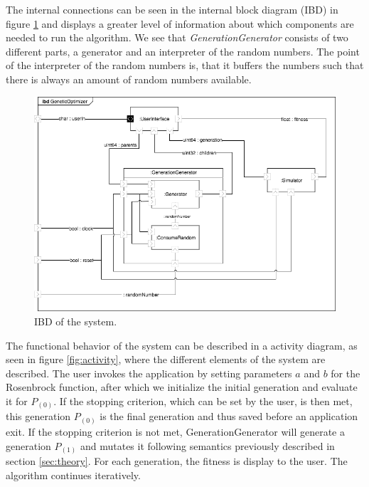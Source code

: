 The internal connections can be seen in the internal block diagram (IBD) in figure \ref{fig:ibd} and displays a greater level of information about which components are needed to run the algorithm. We see that \emph{GenerationGenerator} consists of two different parts, a generator and an interpreter of the random numbers. The point of the interpreter of the random numbers is, that it buffers the numbers such that there is always an amount of random numbers available.

\begin{figure}[h!]
	\centering
	\includegraphics[width=\linewidth]{../diagrams/ibd.png}
	\caption{IBD of the system.}
	\label{fig:ibd}
\end{figure}

The functional behavior of the system can be described in a activity diagram, as seen in figure \ref{fig:activity}, where the different elements of the system are described. The user invokes the application by setting parameters $a$ and $b$ for the Rosenbrock function, after which we initialize the initial generation and evaluate it for $P_{(0)}$. If the stopping criterion, which can be set by the user, is then met, this generation $P_{(0)}$ is the final generation and thus saved before an application exit. If the stopping criterion is not met, GenerationGenerator will generate a generation $P_{(1)}$ and mutates it following semantics previously described in section \ref{sec:theory}. For each generation, the fitness is display to the user. The algorithm continues iteratively.


